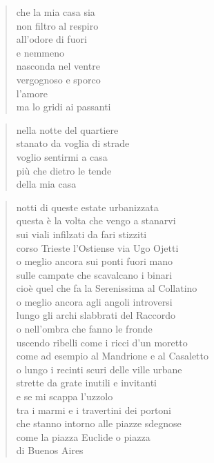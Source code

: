 \begin{verse}
    che la mia casa sia\\
    non filtro al respiro\\
    all'odore di fuori\\
    e nemmeno\\
    nasconda nel ventre\\
    vergognoso e sporco\\
    l'amore\\
    ma lo gridi ai passanti
\end{verse}

\begin{verse}
    nella notte del quartiere\\
    stanato da voglia di strade\\
    voglio sentirmi a casa\\
    più che dietro le tende\\
    della mia casa
\end{verse}

\clearpage


\begin{verse}
    notti di queste estate urbanizzata\\
    questa è la volta che vengo a stanarvi\\
    sui viali infilzati da fari stizziti\\
    corso Trieste l'Ostiense via Ugo Ojetti\\
    o meglio ancora sui ponti fuori mano\\
    sulle campate che scavalcano i binari\\
    cioè quel che fa la Serenissima al Collatino\\
    o meglio ancora agli angoli introversi\\
    lungo gli archi slabbrati del Raccordo\\
    o nell'ombra che fanno le fronde\\
    uscendo ribelli come i ricci d'un moretto\\
    come ad esempio al Mandrione e al Casaletto\\
    o lungo i recinti scuri delle ville urbane\\
    strette da grate inutili e invitanti\\
    e se mi scappa l'uzzolo\\
    tra i marmi e i travertini dei portoni\\
    che stanno intorno alle piazze sdegnose\\
    come la piazza Euclide o piazza\\
    di Buenos Aires
\end{verse}

